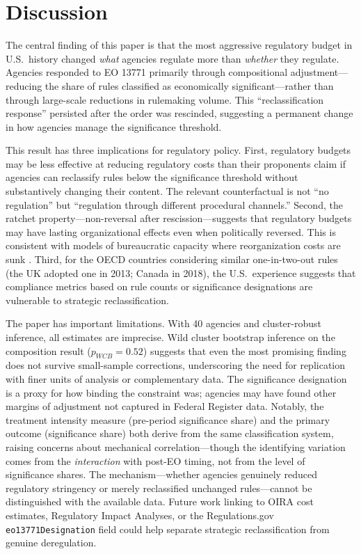 \documentclass[12pt]{article}
\begin{document}
\section{Discussion}

The central finding of this paper is that the most aggressive regulatory budget in U.S.\ history changed \textit{what} agencies regulate more than \textit{whether} they regulate. Agencies responded to EO 13771 primarily through compositional adjustment---reducing the share of rules classified as economically significant---rather than through large-scale reductions in rulemaking volume. This ``reclassification response'' persisted after the order was rescinded, suggesting a permanent change in how agencies manage the significance threshold.

This result has three implications for regulatory policy. First, regulatory budgets may be less effective at reducing regulatory costs than their proponents claim if agencies can reclassify rules below the significance threshold without substantively changing their content. The relevant counterfactual is not ``no regulation'' but ``regulation through different procedural channels.'' Second, the ratchet property---non-reversal after rescission---suggests that regulatory budgets may have lasting organizational effects even when politically reversed. This is consistent with models of bureaucratic capacity where reorganization costs are sunk \citep{lewis2003presidents}. Third, for the OECD countries considering similar one-in-two-out rules (the UK adopted one in 2013; Canada in 2018), the U.S.\ experience suggests that compliance metrics based on rule counts or significance designations are vulnerable to strategic reclassification.

The paper has important limitations. With 40 agencies and cluster-robust inference, all estimates are imprecise. Wild cluster bootstrap inference on the composition result ($p_{WCB} = 0.52$) suggests that even the most promising finding does not survive small-sample corrections, underscoring the need for replication with finer units of analysis or complementary data. The significance designation is a proxy for how binding the constraint was; agencies may have found other margins of adjustment not captured in Federal Register data. Notably, the treatment intensity measure (pre-period significance share) and the primary outcome (significance share) both derive from the same classification system, raising concerns about mechanical correlation---though the identifying variation comes from the \textit{interaction} with post-EO timing, not from the level of significance shares. The mechanism---whether agencies genuinely reduced regulatory stringency or merely reclassified unchanged rules---cannot be distinguished with the available data. Future work linking to OIRA cost estimates, Regulatory Impact Analyses, or the Regulations.gov \texttt{eo13771Designation} field could help separate strategic reclassification from genuine deregulation.
\end{document}
